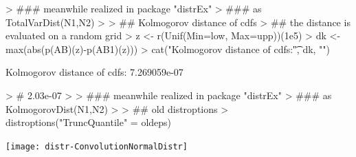 \documentclass[11pt]{article}
\begin{document}
\begin{Schunk}
\begin{Sinput}
> ### meanwhile realized in package "distrEx"
> ### as TotalVarDist(N1,N2)
>
> ## Kolmogorov distance of cdfs
> ## the distance is evaluated on a random grid
> z <- r(Unif(Min=low, Max=upp))(1e5)
> dk <- max(abs(p(AB)(z)-p(AB1)(z)))
> cat("Kolmogorov distance of cdfs:\t", dk, "\n")
\end{Sinput}
\begin{Soutput}
Kolmogorov distance of cdfs:	 7.269059e-07
\end{Soutput}
\begin{Sinput}
> # 2.03e-07
>
> ### meanwhile realized in package "distrEx"
> ### as KolmogorovDist(N1,N2)
>
> ## old distroptions
> distroptions("TruncQuantile" = oldeps)
\end{Sinput}
\end{Schunk}
\texttt{[image: distr-ConvolutionNormalDistr]}
\end{document}
